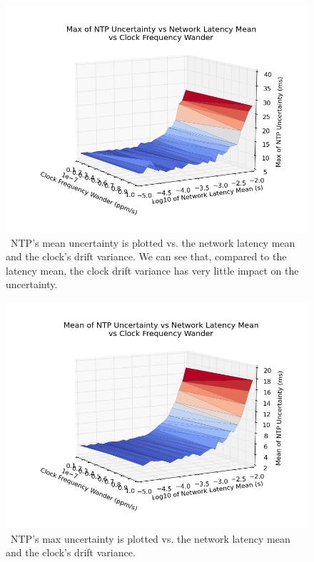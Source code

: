 \begin{figure}[t]
  \caption{~NTP's mean uncertainty is plotted vs. the network latency mean and the clock's drift variance. We can see that, compared to the latency mean, the clock drift variance has very little impact on the uncertainty.}
  \label{fig:max-uncertainty_latency-mean_drift-variance}
  \includegraphics[width=0.8\linewidth]{max_max_err-mean_latency-drift_variance.png}
\end{figure}

\begin{figure}[!htbp]
  \caption{~NTP's max uncertainty is plotted vs. the network latency mean and the clock's drift variance.}
  \label{fig:mean-uncertainty_latency-mean_drift-variance}
  \includegraphics[width=0.8\linewidth]{mean_max_err-mean_latency-drift_variance.png}
\end{figure}


